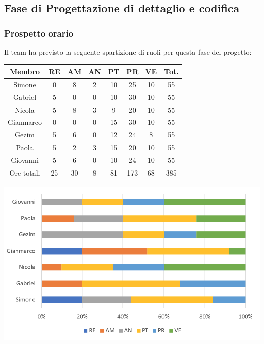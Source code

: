 \newpage
\subsection{Fase di Progettazione di dettaglio e codifica}
\subsubsection{Prospetto orario}
Il team ha previsto la seguente spartizione di ruoli per questa fase del progetto:
\\
\begin{center}
\begin{tabular}{ |c|c|c|c|c|c|c|c|  }
 \hline
 Membro 		& RE 	& AM 	& AN 	& PT 	& PR 	& VE 	& Tot.\\
 \hline\hline
 Simone			& 0 		& 8		& 2 	& 10 	& 25 		& 10 		& 55\\
 Gabriel		& 5 		& 0 		& 0 	& 10		& 30 		& 10 		& 55\\
 Nicola			& 5 		& 8 		& 3 	& 9 		& 20 		& 10 		& 55\\
 Gianmarco		& 0 		& 0 		& 0 	& 15 	& 30 		& 10 		& 55\\
 Gezim			& 5 		& 6 		& 0 	& 12 		& 24 		& 8	 	& 55\\
 Paola			& 5 		& 2 		& 3 	& 15 		& 20 		& 10 		& 55\\
 Giovanni		& 5 		& 6	 	& 0 	& 10 		& 24 		& 10  	& 55\\
 \hline\hline
 Ore totali		& 25		& 30		& 8 	& 81	 	& 173 	& 68 	& 385\\
  \hline
\end{tabular}
\end{center}
\includegraphics[width=\textwidth]{res/img/hi33}
\\
